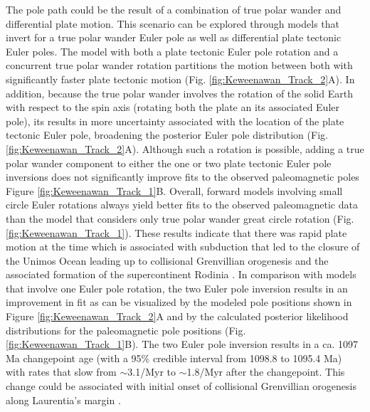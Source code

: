 \documentclass[]{agujournal2019}
\begin{document}
The pole path could be the result of a combination of true polar wander and differential plate motion. This scenario can be explored through models that invert for a true polar wander Euler pole as well as differential plate tectonic Euler poles. The model with both a plate tectonic Euler pole rotation and a concurrent true polar wander rotation partitions the motion between both with significantly faster plate tectonic motion (Fig. \ref{fig:Keweenawan_Track_2}A). In addition, because the true polar wander involves the rotation of the solid Earth with respect to the spin axis (rotating both the plate an its associated Euler pole), its results in more uncertainty associated with the location of the plate tectonic Euler pole, broadening the posterior Euler pole distribution (Fig. \ref{fig:Keweenawan_Track_2}A). Although such a rotation is possible, adding a true polar wander component to either the one or two plate tectonic Euler pole inversions does not significantly improve fits to the observed paleomagnetic poles Figure \ref{fig:Keweenawan_Track_1}B. Overall, forward models involving small circle Euler rotations always yield better fits to the observed paleomagnetic data than the model that considers only true polar wander great circle rotation (Fig. \ref{fig:Keweenawan_Track_1}). These results indicate that there was rapid plate motion at the time which is associated with subduction that led to the closure of the Unimos Ocean leading up to collisional Grenvillian orogenesis and the associated formation of the supercontinent Rodinia \cite{Hynes2010a, Swanson-Hysell2022a}. In comparison with models that involve one Euler pole rotation, the two Euler pole inversion results in an improvement in fit as can be visualized by the modeled pole positions shown in Figure \ref{fig:Keweenawan_Track_2}A and by the calculated posterior likelihood distributions for the paleomagnetic pole positions (Fig. \ref{fig:Keweenawan_Track_1}B). The two Euler pole inversion results in a ca. 1097 Ma changepoint age (with a 95\% credible interval from 1098.8 to 1095.4 Ma) with rates that slow from $\sim$3.1\textdegree /Myr to $\sim$1.8\textdegree /Myr after the changepoint. This change could be associated with initial onset of collisional Grenvillian orogenesis along Laurentia's margin \cite{Swanson-Hysell2019a}.
\end{document}
